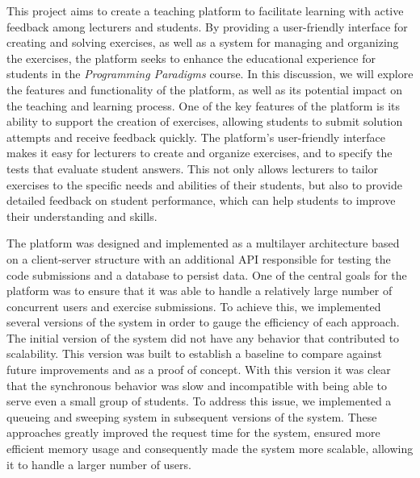 This project aims to create a teaching platform to facilitate learning with active feedback among lecturers and students. 
By providing a user-friendly interface for creating and solving exercises, as well as a system for managing and organizing the exercises, the platform seeks to enhance the educational experience for students in the \textit{Programming Paradigms} course. 
In this discussion, we will explore the features and functionality of the platform, as well as its potential impact on the teaching and learning process.
One of the key features of the platform is its ability to support the creation of exercises, allowing students to submit solution attempts and receive feedback quickly.
The platform's user-friendly interface makes it easy for lecturers to create and organize exercises, and to specify the tests that evaluate student answers. This not only allows lecturers to tailor exercises to the specific needs and abilities of their students, but also to provide detailed feedback on student performance, which can help students to improve their understanding and skills.

The platform was designed and implemented as a multilayer architecture based on a client-server structure with an additional API responsible for testing the code submissions and a database to persist data. 
One of the central goals for the platform was to ensure that it was able to handle a relatively large number of concurrent users and exercise submissions. 
To achieve this, we implemented several versions of the system in order to gauge the efficiency of each approach. The initial version of the system did not have any behavior that contributed to scalability. 
This version was built to establish a baseline to compare against future improvements and as a proof of concept. With this version it was clear that the synchronous behavior was slow and incompatible with being able to serve even a small group of students.
To address this issue, we implemented a queueing and sweeping system in subsequent versions of the system. These approaches greatly improved the request time for the system, ensured more efficient memory usage and consequently made the system more scalable, allowing it to handle a larger number of users. 

